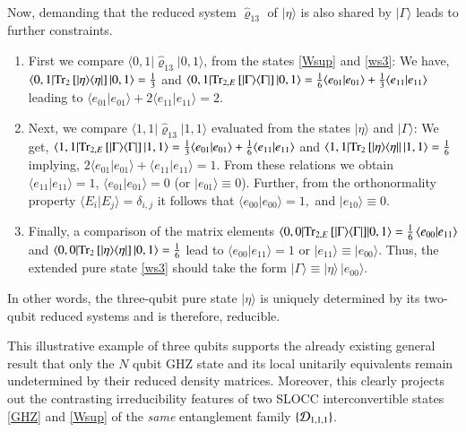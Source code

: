 {\begin{align}
\end{align}
Now, demanding that the reduced system $\hat{\varrho}_{13}$ of $\vert \eta\rangle$ is also shared by  $\vert \Gamma\rangle$ leads to further constraints.  
\begin{enumerate}
\item First we compare  $\langle 0,1\vert \hat{\varrho}_{13}\vert 0,1\rangle$,  from the states \eqref{Wsup} and \eqref{ws3}: We have, $\langle 0,1|{\rm Tr}_{2}\,[\vert\eta\rangle \langle\eta\vert]\, |0,1\rangle= \frac{1}{3}$ and $\langle 0,1|{\rm Tr}_{2,E}\,[\vert\Gamma\rangle \langle\Gamma\vert]\, |0,1\rangle= \frac{1}{6}\langle e_{01}|e_{01}\rangle+\frac{1}{3}\langle e_{11}|e_{11}\rangle$ leading to $\langle e_{01}|e_{01}\rangle+2\langle e_{11}|e_{11}\rangle=2$. 

\item Next, we compare  $\langle 1,1\vert \hat{\varrho}_{13}\vert 1,1\rangle$ evaluated from the states $\vert\eta\rangle$ and $\vert\Gamma\rangle$: We get, $\langle 1,1|{\rm Tr}_{2, E}\, [|\Gamma\rangle \langle\Gamma|]\,\vert 1,1\rangle=\frac{1}{3}\langle e_{01}|e_{01}\rangle+\frac{1}{6}\langle e_{11}|e_{11}\rangle$ and $\langle 1,1|{\rm Tr}_{2}\, [|\eta\rangle \langle\eta|\vert\, |1,1\rangle=\frac{1}{6}$ implying, $2\langle e_{01}|e_{01}\rangle+\langle e_{11}|e_{11}\rangle=1$. From these relations we obtain $\langle e_{11}|e_{11}\rangle=1$, $\langle e_{01}|e_{01}\rangle=0$ (or $\vert e_{01}\rangle\equiv 0$). Further, from the orthonormality property $\langle E_i\vert E_j\rangle=\delta_{i,j}$ it follows that $\langle e_{00}\vert e_{00}\rangle=1,$ and $\vert e_{10}\rangle\equiv 0$. 

\item Finally, a comparison of the matrix elements $\langle 0,0|{\rm Tr}_{2,E}\,[\vert\Gamma\rangle \langle\Gamma\vert]\break |0,1\rangle= \frac{1}{6}\, \langle e_{00}|e_{11}\rangle$ and  $\langle 0,0|{\rm Tr}_{2}\,[\vert\eta\rangle \langle\eta\vert]\, |0,1\rangle= \frac{1}{6}$ lead to $\langle e_{00}|e_{11}\rangle=1$ or $\vert e_{11}\rangle\equiv \vert e_{00}\rangle$. Thus,  the extended pure state \eqref{ws3} should take the form $\vert \Gamma\rangle\equiv \vert \eta\rangle \, \vert e_{00}\rangle$. 
\end{enumerate}
In other words,  the three-qubit pure state $\vert \eta\rangle$  is uniquely determined by its two-qubit reduced systems and is therefore, reducible. 

This illustrative example of three qubits supports the already existing general result \cite{Walck,Walck2} that only the $N$ qubit GHZ state and its local unitarily equivalents remain undetermined by their reduced density matrices. Moreover, this clearly projects out the contrasting  irreducibility features of two SLOCC interconvertible states \eqref{GHZ} and \eqref{Wsup} of the {\em same} entanglement family $\{{\cal D}_{1,1,1}\}$.   

}
